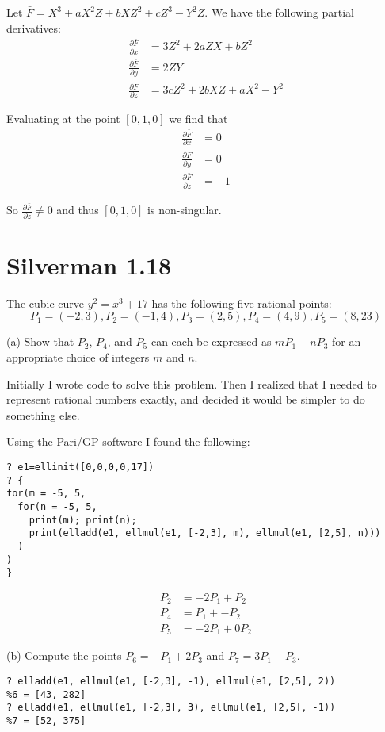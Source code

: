 \documentclass{article}
\begin{document}
Let $\bar F = X^3 + aX^2 Z + bXZ^2 + cZ^3 - Y^2Z$. We have the following partial derivatives:
\begin{align*}
\frac{\partial \bar F}{\partial x} &= 3Z^2 + 2aZX + bZ^2 \\
\frac{\partial \bar F}{\partial y} &= 2ZY \\
\frac{\partial \bar F}{\partial z} &= 3cZ^2 + 2bXZ + aX^2 - Y^2
\end{align*}

Evaluating at the point $[0,1,0]$ we find that
\begin{align*}
\frac{\partial \bar F}{\partial x} &= 0 \\
\frac{\partial \bar F}{\partial y} &= 0 \\
\frac{\partial \bar F}{\partial z} &= -1
\end{align*}

So $\frac{\partial \bar F}{\partial z} \neq 0$ and thus $[0,1,0]$ is non-singular.

\section{Silverman 1.18}
The cubic curve $y^2 = x^3 + 17$ has the following five rational points:
$$P_1 = (-2,3), P_2 = (-1,4), P_3 = (2,5), P_4 = (4,9), P_5 = (8,23)$$

(a) Show that $P_2$, $P_4$, and $P_5$ can each be expressed as $mP_1 + nP_3$ for an appropriate choice of integers $m$ and $n$.

Initially I wrote code to solve this problem. Then I realized that I needed to represent rational numbers exactly, and decided it would be simpler to do something else.

Using the Pari/GP software I found the following:
\begin{verbatim}
? e1=ellinit([0,0,0,0,17])
? {
for(m = -5, 5,
  for(n = -5, 5,
    print(m); print(n);
    print(elladd(e1, ellmul(e1, [-2,3], m), ellmul(e1, [2,5], n)))
  )
)
}
\end{verbatim}

\begin{align*}
P_2 &= -2P_1 + P_2 \\
P_4 &= P_1 + -P_2 \\
P_5 &= -2P_1 + 0P_2
\end{align*}

(b) Compute the points $P_6 = -P_1 + 2P_3$ and $P_7 = 3P_1 - P_3$.
\begin{verbatim}
? elladd(e1, ellmul(e1, [-2,3], -1), ellmul(e1, [2,5], 2))
%6 = [43, 282]
? elladd(e1, ellmul(e1, [-2,3], 3), ellmul(e1, [2,5], -1))
%7 = [52, 375]
\end{verbatim}
\end{document}
